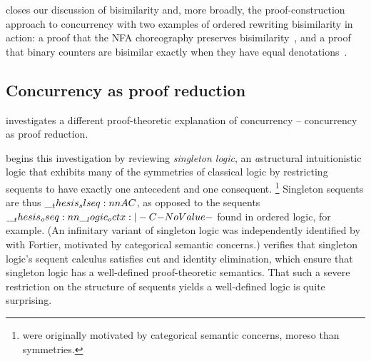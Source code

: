  closes our discussion of bisimilarity and, more broadly, the proof-construction approach to concurrency with two examples of ordered rewriting bisimilarity in action: a proof that the \acs*{NFA} choreography preserves bisimilarity~, and a proof that binary counters are bisimilar exactly when they have equal denotations~.







\subsection{Concurrency as proof reduction}

 investigates a different proof-theoretic explanation of concurrency -- concurrency as proof reduction.

 begins this investigation by reviewing \emph{singleton logic}\autocites{Santocanale:FOSSACS02}{Fortier+Santocanale:CSL13}, an \emph{a}struc\-tural intuitionistic logic that exhibits many of the symmetries of classical logic by restricting sequents to have exactly one antecedent and one consequent.%
\footnote{ were originally motivated by categorical semantic concerns, moreso than symmetries.}
Singleton sequents are thus $\slseq{A |- C}$, as opposed to the sequents $\oseq{\octx |- C}$ found in ordered logic, for example.
(An infinitary variant of singleton logic was independently identified by \citeauthor{Santocanale:FOSSACS02} with Fortier\autocites{Santocanale:FOSSACS02}{Fortier+Santocanale:CSL13}, motivated by categorical semantic concerns.)
 verifies that singleton logic's sequent calculus satisfies cut and identity elimination, which ensure that singleton logic has a well-defined proof-theoretic semantics.%
That such a severe restriction on the structure of sequents yields a well-defined logic is quite surprising.


